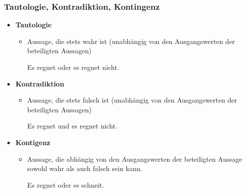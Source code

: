 \begin{frame}
\frametitle{Tautologie, Kontradiktion, Kontingenz}

\begin{itemize}
	\item \textbf{Tautologie}
	
	\begin{itemize}
		\item Aussage, die stets wahr ist (unabhängig von den
Ausgangswerten der beteiligten Aussagen)
		
		\ea Es regnet oder es regnet nicht.
		\z
		
	\end{itemize}
	
	\item \textbf{Kontradiktion}
	
	\begin{itemize}
		\item  Aussage, die stets falsch ist (unabhängig von den
Ausgangswerten der beteiligten Aussagen)

		\ea Es regnet und es regnet nicht.
		\z
		
	\end{itemize}
	
	\item \textbf{Kontigenz}
	
	\begin{itemize}
		\item Aussage, die abhängig von den Ausgangswerten der beteiligten Aussage sowohl wahr als auch falsch sein kann.

		\ea Es regnet oder es schneit.
		\z

	\end{itemize}
	
\end{itemize}


\end{frame}



